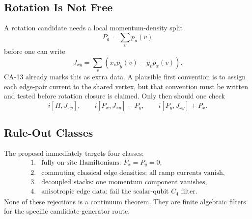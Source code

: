 \subsection{Rotation Is Not Free}

A rotation candidate needs a local momentum-density split
\[
  P_a=\sum_v p_a(v)
\]
before one can write
\[
  J_{xy}=\sum_v(x_vp_y(v)-y_vp_x(v)).
\]
CA-13 already marks this as extra data.  A plausible first convention is to
assign each edge-pair current to the shared vertex, but that convention must be
written and tested before rotation closure is claimed.  Only then should one
check
\[
  i[H,J_{xy}],\qquad
  i[P_x,J_{xy}]-P_y,\qquad
  i[P_y,J_{xy}]+P_x.
\]

\subsection{Rule-Out Classes}

The proposal immediately targets four classes:
\[
\begin{array}{ll}
1.&\text{fully on-site Hamiltonians: }P_x=P_y=0,\\
2.&\text{commuting classical edge densities: all ramp currents vanish,}\\
3.&\text{decoupled stacks: one momentum component vanishes,}\\
4.&\text{anisotropic edge data: fail the scalar-qubit }C_4\text{ filter.}
\end{array}
\]
None of these rejections is a continuum theorem.  They are finite algebraic
filters for the specific candidate-generator route.

